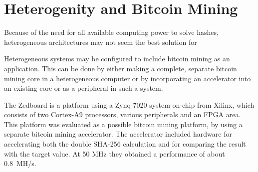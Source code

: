 





\section{Heterogenity and Bitcoin Mining}

Because of the need for all available computing power to solve hashes, heterogeneous architectures
may not seem the best solution for 

Heterogeneous systems may be configured to include bitcoin mining as an application. This can be
done by either making a complete, separate bitcoin mining core in a heterogeneous computer
or by incorporating an accelerator into an existing core or as a peripheral in such a system.

The Zedboard is a platform using a Zynq-7020 system-on-chip from Xilinx, which consists of
two Cortex-A9 processors, various peripherals and an FPGA area. This platform was evaluated
as a possible bitcoin mining platform, by using a separate bitcoin mining
accelerator. The accelerator included hardware for accelerating both the double SHA-256 calculation
and for comparing the result with the target value. At 50 MHz they obtained a performance of about
0.8~MH/s. \cite{xcell-bitcoin,standridge-master}


